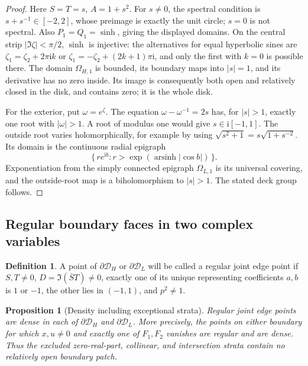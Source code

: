 \documentclass[11pt]{article}
\numberwithin{equation}{section}
\newtheorem{proposition}[theorem]{Proposition}
\theoremstyle{definition}
\newtheorem{definition}[theorem]{Definition}
\newcommand{\ii}{\mathrm i}
\renewcommand{\DH}{\mathcal D_H}
\newcommand{\DL}{\mathcal D_L}
\begin{document}
\begin{proof}
Here \(S=T=s\), \(A=1+s^2\).  For \(s\ne0\), the spectral
condition is \(s+s^{-1}\in[-2,2]\), whose preimage is
exactly the unit circle; \(s=0\) is not spectral.
Also \(P_1=Q_1=\sinh\), giving the displayed domains.
On the central strip \(|\Im\zeta|<\pi/2\), \(\sinh\)
is injective: the alternatives for equal hyperbolic sines
are \(\zeta_1=\zeta_2+2\pi\ii k\) or
\(\zeta_1=-\zeta_2+(2k+1)\pi\ii\), and only the first
with \(k=0\) is possible there.  The domain
\(\Omega_{H,1}\) is bounded, its boundary maps into
\(|s|=1\), and its derivative has no zero inside.
Its image is consequently both open and relatively closed
in the disk, and contains zero; it is the whole disk.

For the exterior, put \(\omega=e^\zeta\).
The equation \(\omega-\omega^{-1}=2s\) has, for \(|s|>1\),
exactly one root with \(|\omega|>1\).
A root of modulus one would give \(s\in\ii[-1,1]\).
The outside root varies holomorphically, for example by
using \(\sqrt{s^2+1}=s\sqrt{1+s^{-2}}\).
Its domain is the continuous radial epigraph
\[
 \{\,r e^{\ii b}:r>\exp(\operatorname{arsinh}|\cos b|)\,\}.
 \]
Exponentiation from the simply connected epigraph
\(\Omega_{L,1}\) is its universal covering, and the
outside-root map is a biholomorphism to \(|s|>1\).
The stated deck group follows.
\end{proof}

\subsection{Regular boundary faces in two complex variables}
\label{geo:regular-section}

\begin{definition}\label{geo:regular-definition}
A point of \(\partial\DH\) or \(\partial\DL\) will be called
a regular joint edge point if \(S,T\ne0\),
\(D=\Im(\overline S T)\ne0\), exactly one of its unique
representing coefficients \(a,b\) is \(1\) or \(-1\),
the other lies in \((-1,1)\), and \(p^2\ne1\).
\end{definition}

\begin{proposition}[Density including exceptional strata]
\label{geo:joint-density}
Regular joint edge points are dense in each of
\(\partial\DH\) and \(\partial\DL\).
More precisely, the points on either boundary for which
\(x,u\ne0\) and exactly one of \(F_1,F_2\) vanishes
are regular and are dense.  Thus the excluded zero-real-part,
collinear, and intersection strata contain no relatively
open boundary patch.
\end{proposition}
\end{document}
